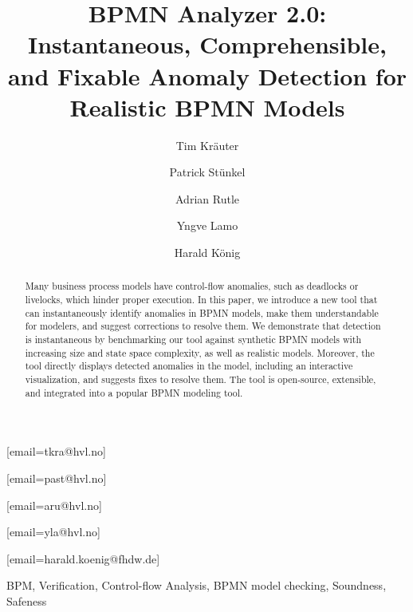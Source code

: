 \documentclass[
twocolumn,
]{ceurart}
\begin{document}


\title{BPMN Analyzer 2.0: Instantaneous, Comprehensible, and Fixable Anomaly Detection for Realistic BPMN Models}

\author[1]{Tim Kräuter}
[email=tkra@hvl.no]
\author[1]{Patrick Stünkel}
[email=past@hvl.no] %
\author[1]{Adrian Rutle}
[email=aru@hvl.no]
\author[1]{Yngve Lamo}
[email=yla@hvl.no]
\author[2,1]{Harald König}
[email=harald.koenig@fhdw.de]
\address[1]{Western Norway University of Applied Sciences, Bergen, Norway}
\address[2]{FHDW Hannover, Germany}

\begin{abstract}
Many business process models have control-flow anomalies, such as deadlocks or livelocks, which hinder proper execution.
In this paper, we introduce a new tool that can instantaneously identify anomalies in BPMN models, make them understandable for modelers, and suggest corrections to resolve them.
We demonstrate that detection is instantaneous by benchmarking our tool against synthetic BPMN models with increasing size and state space complexity, as well as realistic models.
Moreover, the tool directly displays detected anomalies in the model, including an interactive visualization, and suggests fixes to resolve them.
The tool is open-source, extensible, and integrated into a popular BPMN modeling tool.
\end{abstract}

\begin{keywords}
BPM,
Verification,
Control-flow Analysis,
BPMN model checking,
Soundness,
Safeness
\end{keywords}

\maketitle


\end{document}
